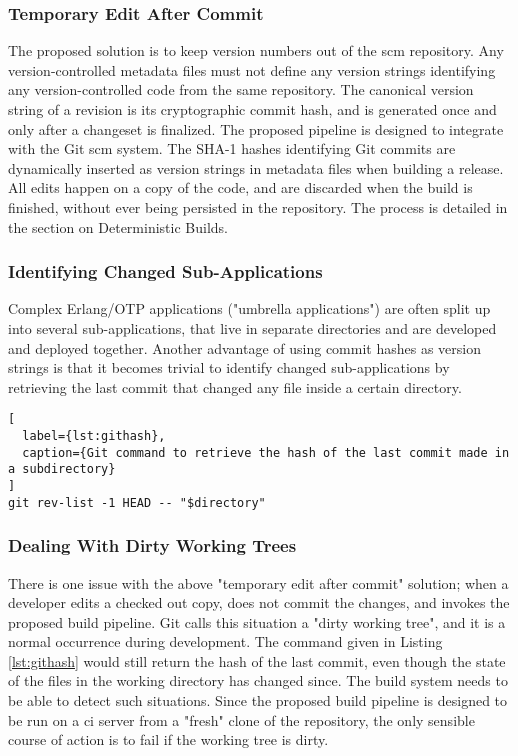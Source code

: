 \subsubsection{Temporary Edit After Commit}
The proposed solution is to keep version numbers out of the \acrfull{scm} repository. Any version-controlled metadata files must not define any version strings identifying any version-controlled code from the same repository. The canonical version string of a revision is its cryptographic commit hash, and is generated once and only after a changeset is finalized. The proposed pipeline is designed to integrate with the Git \acrshort{scm} system. The SHA-1 hashes identifying Git commits are dynamically inserted as version strings in metadata files when building a release. All edits happen on a copy of the code, and are discarded when the build is finished, without ever being persisted in the repository. The process is detailed in the section on Deterministic Builds.

\subsubsection{Identifying Changed Sub-Applications}
Complex Erlang/OTP applications ("umbrella applications") are often split up into several sub-applications, that live in separate directories and are developed and deployed together. Another advantage of using commit hashes as version strings is that it becomes trivial to identify changed sub-applications by retrieving the last commit that changed any file inside a certain directory.

\begin{lstlisting}[
  label={lst:githash},
  caption={Git command to retrieve the hash of the last commit made in a subdirectory}
]
git rev-list -1 HEAD -- "$directory"
\end{lstlisting}


\subsubsection{Dealing With Dirty Working Trees}
There is one issue with the above "temporary edit after commit" solution; when a developer edits a checked out copy, does not commit the changes, and invokes the proposed build pipeline. Git calls this situation a "dirty working tree", and it is a normal occurrence during development. The command given in Listing \ref{lst:githash} would still return the hash of the last commit, even though the state of the files in the working directory has changed since. The build system needs to be able to detect such situations. Since the proposed build pipeline is designed to be run on a \acrshort{ci} server from a "fresh" clone of the repository, the only sensible course of action is to fail if the working tree is dirty.

